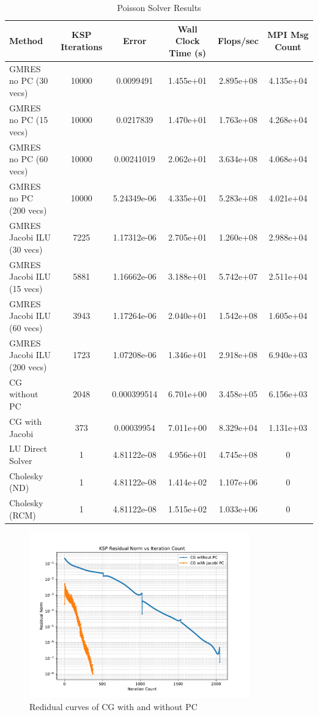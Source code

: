 \begin{table}[h!]
\hspace{-2.5cm}\begin{tabular}{lccccc}
\hline
\textbf{Method} & \textbf{KSP Iterations} & \textbf{Error} & \textbf{Wall Clock Time (s)} & \textbf{Flops/sec} & \textbf{MPI Msg Count} \\
\hline
GMRES no PC (30 vecs) & 10000 & 0.0099491 & 1.455e+01 & 2.895e+08 & 4.135e+04 \\
GMRES no PC (15 vecs) & 10000 & 0.0217839 & 1.470e+01 & 1.763e+08 & 4.268e+04 \\
GMRES no PC (60 vecs) & 10000 & 0.00241019 & 2.062e+01  & 3.634e+08 & 4.068e+04 \\
GMRES no PC (200 vecs) & 10000 & 5.24349e-06 & 4.335e+01 & 5.283e+08 & 4.021e+04 \\
\hline
GMRES Jacobi ILU (30 vecs) & 7225 & 1.17312e-06 & 2.705e+01  & 1.260e+08 & 2.988e+04 \\
GMRES Jacobi ILU (15 vecs) & 5881 & 1.16662e-06 & 3.188e+01  & 5.742e+07 & 2.511e+04 \\
GMRES Jacobi ILU (60 vecs) & 3943 & 1.17264e-06 & 2.040e+01 & 1.542e+08 & 1.605e+04 \\
GMRES Jacobi ILU (200 vecs) & 1723 & 1.07208e-06 & 1.346e+01 & 2.918e+08 & 6.940e+03 \\
\hline
CG without PC & 2048 & 0.000399514 & 6.701e+00 &  3.458e+05 & 6.156e+03 \\
CG with Jacobi & 373 & 0.00039954 & 7.011e+00 &  8.329e+04 & 1.131e+03 \\
\hline
LU Direct Solver & 1 & 4.81122e-08  & 4.956e+01 & 4.745e+08 & 0 \\
Cholesky (ND) & 1 & 4.81122e-08 & 1.414e+02 & 1.107e+06  & 0 \\
Cholesky (RCM) & 1 & 4.81122e-08 & 1.515e+02 & 1.033e+06 & 0 \\
\hline
\end{tabular}
\caption{Poisson Solver Results}
\label{nomgcombos}
\end{table}

\begin{figure}[h!]
\centering
\includegraphics[width=0.85\textwidth]{CGplot.pdf}
\caption{Redidual curves of CG with and without PC}
\label{CG_plot}
\end{figure}
\FloatBarrier


